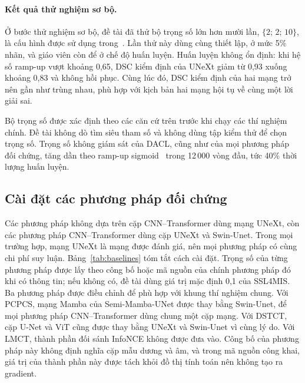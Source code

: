 \paragraph{Kết quả thử nghiệm sơ bộ.} Ở bước thử nghiệm sơ bộ, đề tài đã thử bộ trọng số lớn hơn mười lần, $\{2;\,2;\,10\}$, là cấu hình được sử dụng trong~\cite{wang2026dacl}. Lần thử này dùng cùng thiết lập, ở mức 5\% nhãn, và giáo viên còn để ở chế độ huấn luyện. Huấn luyện không ổn định: khi hệ số ramp-up vượt khoảng 0,65, DSC kiểm định của UNeXt giảm từ 0,93 xuống khoảng 0,83 và không hồi phục. Cùng lúc đó, DSC kiểm định của hai mạng trở nên gần như trùng nhau, phù hợp với kịch bản hai mạng hội tụ về cùng một lời giải sai.

Bộ trọng số được xác định theo các căn cứ trên trước khi chạy các thí nghiệm chính. Đề tài không dò tìm siêu tham số và không dùng tập kiểm thử để chọn trọng số. Trọng số không giám sát của DACL, cũng như của mọi phương pháp đối chứng, tăng dần theo ramp-up sigmoid~\cite{laine2017temporal} trong 12\,000 vòng đầu, tức 40\% thời lượng huấn luyện.

\subsection{Cài đặt các phương pháp đối chứng}
\label{sec:baseline-impl}

Các phương pháp không dựa trên cặp CNN--Transformer dùng mạng UNeXt, còn các phương pháp CNN--Transformer dùng cặp UNeXt và Swin-Unet. Trong mọi trường hợp, mạng UNeXt là mạng được đánh giá, nên mọi phương pháp có cùng chi phí suy luận. Bảng~\ref{tab:baselines} tóm tắt cách cài đặt. Trọng số của từng phương pháp được lấy theo công bố hoặc mã nguồn của chính phương pháp đó khi có thông tin; nếu không có, đề tài dùng giá trị mặc định 0,1 của SSL4MIS. Ba phương pháp được điều chỉnh để phù hợp với khung thí nghiệm chung. Với PCPCS, mạng Mamba của Semi-Mamba-UNet được thay bằng Swin-Unet, để mọi phương pháp CNN--Transformer dùng chung một cặp mạng. Với DSTCT, cặp U-Net và ViT cũng được thay bằng UNeXt và Swin-Unet vì cùng lý do. Với LMCT, thành phần đối sánh InfoNCE không được đưa vào. Công bố của phương pháp này không định nghĩa cặp mẫu dương và âm, và trong mã nguồn công khai, giá trị của thành phần này được tách khỏi đồ thị tính toán nên không tạo ra gradient.


